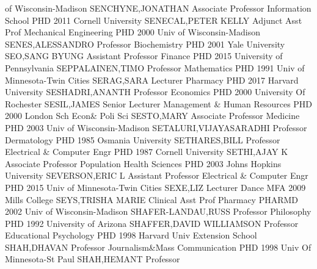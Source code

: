 \documentclass[
]{article}
\begin{document}
of Wisconsin-Madison \textbar{}  \textbar SENCHYNE,JONATHAN
\textbar Associate Professor \textbar Information School \textbar PHD
2011 Cornell University \textbar{}  \textbar SENECAL,PETER
KELLY \textbar Adjunct Asst Prof \textbar Mechanical Engineering
\textbar PHD 2000 Univ of Wisconsin-Madison \textbar{} 
\textbar SENES,ALESSANDRO \textbar Professor \textbar Biochemistry
\textbar PHD 2001 Yale University \textbar{} 
\textbar SEO,SANG BYUNG \textbar Assistant Professor \textbar Finance
\textbar PHD 2015 University of Pennsylvania \textbar{} 
\textbar SEPPALAINEN,TIMO \textbar Professor \textbar Mathematics
\textbar PHD 1991 Univ of Minnesota-Twin Cities \textbar{} 
\textbar SERAG,SARA \textbar Lecturer \textbar Pharmacy \textbar PHD
2017 Harvard University \textbar{}  \textbar SESHADRI,ANANTH
\textbar Professor \textbar Economics \textbar PHD 2000 University Of
Rochester \textbar{}  \textbar SESIL,JAMES \textbar Senior
Lecturer \textbar Management \& Human Resources \textbar PHD 2000 London
Sch Econ\& Poli Sci \textbar{}  \textbar SESTO,MARY
\textbar Associate Professor \textbar Medicine \textbar PHD 2003 Univ of
Wisconsin-Madison \textbar{} 
\textbar SETALURI,VIJAYASARADHI \textbar Professor \textbar Dermatology
\textbar PHD 1985 Osmania University \textbar{} 
\textbar SETHARES,BILL \textbar Professor \textbar Electrical \&
Computer Engr \textbar PHD 1987 Cornell University \textbar{}
 \textbar SETHI,AJAY K \textbar Associate Professor
\textbar Population Health Sciences \textbar PHD 2003 Johns Hopkins
University \textbar{}  \textbar SEVERSON,ERIC L
\textbar Assistant Professor \textbar Electrical \& Computer Engr
\textbar PHD 2015 Univ of Minnesota-Twin Cities \textbar{} 
\textbar SEXE,LIZ \textbar Lecturer \textbar Dance \textbar MFA 2009
Mills College \textbar{}  \textbar SEYS,TRISHA MARIE
\textbar Clinical Asst Prof \textbar Pharmacy \textbar PHARMD 2002 Univ
of Wisconsin-Madison \textbar{}  \textbar SHAFER-LANDAU,RUSS
\textbar Professor \textbar Philosophy \textbar PHD 1992 University of
Arizona \textbar{}  \textbar SHAFFER,DAVID WILLIAMSON
\textbar Professor \textbar Educational Psychology \textbar PHD 1998
Harvard Univ Extension School \textbar{} 
\textbar SHAH,DHAVAN \textbar Professor \textbar Journalism\&Mass
Communication \textbar PHD 1998 Univ Of Minnesota-St Paul \textbar{}
 \textbar SHAH,HEMANT \textbar Professor
\end{document}
